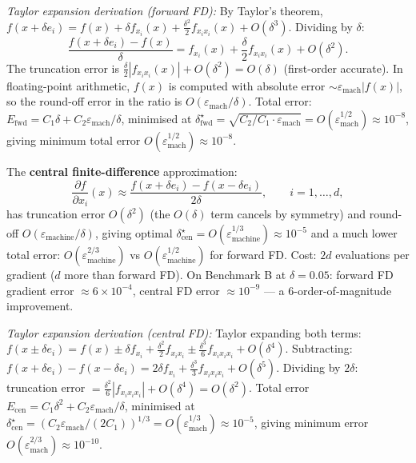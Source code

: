 \documentclass[11pt,a4paper]{article}
\theoremstyle{definition}
\begin{document}
\noindent\textit{Taylor expansion derivation (forward FD):} By Taylor's theorem, $f(x + \delta e_i) = f(x) + \delta f_{x_i}(x) + \frac{\delta^2}{2}f_{x_i x_i}(x) + O(\delta^3)$. Dividing by $\delta$:
\[
\frac{f(x + \delta e_i) - f(x)}{\delta} = f_{x_i}(x) + \frac{\delta}{2}f_{x_i x_i}(x) + O(\delta^2).
\]
The truncation error is $\frac{\delta}{2}|f_{x_i x_i}(x)| + O(\delta^2) = O(\delta)$ (first-order accurate). In floating-point arithmetic, $f(x)$ is computed with absolute error $\sim \varepsilon_{\text{mach}}|f(x)|$, so the round-off error in the ratio is $O(\varepsilon_{\text{mach}}/\delta)$. Total error: $E_{\text{fwd}} = C_1 \delta + C_2 \varepsilon_{\text{mach}}/\delta$, minimised at $\delta^{\star}_{\text{fwd}} = \sqrt{C_2/C_1 \cdot \varepsilon_{\text{mach}}} = O(\varepsilon_{\text{mach}}^{1/2}) \approx 10^{-8}$, giving minimum total error $O(\varepsilon_{\text{mach}}^{1/2}) \approx 10^{-8}$.

The \textbf{central finite-difference} approximation:
\begin{equation}
\frac{\partial f}{\partial x_i}(x) \approx \frac{f(x + \delta e_i) - f(x - \delta e_i)}{2\delta}, \qquad i = 1, \ldots, d,
\label{eq:fd_central}
\end{equation}
has truncation error $O(\delta^2)$ (the $O(\delta)$ term cancels by symmetry) and round-off $O(\varepsilon_{\text{machine}}/\delta)$, giving optimal $\delta^{\star}_{\text{cen}} = O(\varepsilon_{\text{machine}}^{1/3}) \approx 10^{-5}$ and a much lower total error: $O(\varepsilon_{\text{machine}}^{2/3})$ vs $O(\varepsilon_{\text{machine}}^{1/2})$ for forward FD. Cost: $2d$ evaluations per gradient ($d$ more than forward FD). On Benchmark B at $\delta = 0.05$: forward FD gradient error $\approx 6 \times 10^{-4}$, central FD error $\approx 10^{-9}$ --- a $6$-order-of-magnitude improvement.

\noindent\textit{Taylor expansion derivation (central FD):} Taylor expanding both terms: $f(x \pm \delta e_i) = f(x) \pm \delta f_{x_i} + \frac{\delta^2}{2}f_{x_i x_i} \pm \frac{\delta^3}{6}f_{x_i x_i x_i} + O(\delta^4)$. Subtracting: $f(x+\delta e_i) - f(x-\delta e_i) = 2\delta f_{x_i} + \frac{\delta^3}{3}f_{x_i x_i x_i} + O(\delta^5)$. Dividing by $2\delta$: truncation error $= \frac{\delta^2}{6}|f_{x_i x_i x_i}| + O(\delta^4) = O(\delta^2)$. Total error $E_{\text{cen}} = C_1 \delta^2 + C_2 \varepsilon_{\text{mach}}/\delta$, minimised at $\delta^{\star}_{\text{cen}} = (C_2 \varepsilon_{\text{mach}}/(2C_1))^{1/3} = O(\varepsilon_{\text{mach}}^{1/3}) \approx 10^{-5}$, giving minimum error $O(\varepsilon_{\text{mach}}^{2/3}) \approx 10^{-10}$.
\end{document}
